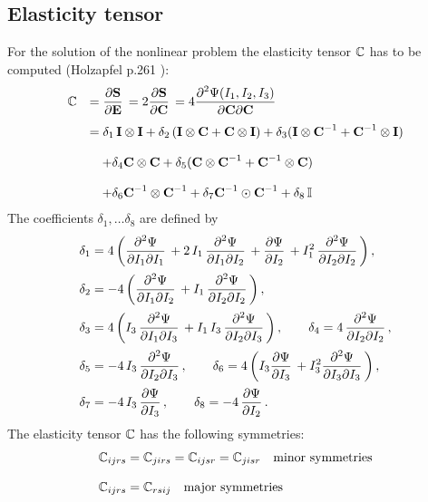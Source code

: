 \subsection{Elasticity tensor}
For the solution of the nonlinear problem the elasticity tensor $\mathbb{C}$ has to be computed (Holzapfel p.261  \cite{holzapfel2000nonlinear}):
\begin{equation*}
  \begin{array}{lll}
    \bbC &= \p{\bfS}{\bfE} = 2\p{\bfS}{\bfC} = 4\dfrac{\partial^2\Psi(I_1,I_2,I_3)}{\p\bfC\p\bfC}\\[4mm]
     &= \delta_1\,\bfI \otimes \bfI + \delta_2\,(\bfI \otimes \bfC + \bfC \otimes \bfI) + \delta_3 ( \bfI \otimes \bfC^{-1} + \bfC^{-1} \otimes \bfI)\\[4mm]
     &\quad +  \delta_4 \bfC \otimes \bfC + \delta_5(\bfC \otimes \bfC^{-1} + \bfC^{-1}\otimes \bfC) \\[4mm]
     & \quad + \delta_6 \bfC^{-1} \otimes \bfC^{-1} + \delta_7 \bfC^{-1} \odot \bfC^{-1} + \delta_8\,\bbI
  \end{array}
\end{equation*}
The coefficients $\delta_1, \dots \delta_8$ are defined by
\begin{equation*}
  \begin{array}{lll}
    \delta_1 = 4\left(\dfrac{\partial^2\Psi}{\p I_1 \p I_1} + 2\,I_1\,\dfrac{\partial^2\Psi}{\p I_1 \p I_2} + \p{\Psi}{I_2} + I_1^2\,\dfrac{\partial^2\Psi}{\p I_2 \p I_2} \right),\\[4mm]
    \delta_2 = -4\left(\dfrac{\partial^2\Psi}{\p I_1 \p I_2} + I_1\,\dfrac{\partial^2\Psi}{\p I_2 \p I_2}\right),\\[4mm]
    \delta_3 = 4\left(I_3\,\dfrac{\partial^2\Psi}{\p I_1 \p I_3} + I_1\,I_3\,\dfrac{\partial^2\Psi}{\p I_2 \p I_3}\right), \qquad \delta_4 = 4\,\dfrac{\partial^2\Psi}{\p I_2 \p I_2},\\[4mm]
    \delta_5 = -4\,I_3\,\dfrac{\partial^2\Psi}{\p I_2 \p I_3}, \qquad \delta_6 = 4\left(I_3\p{\Psi}{I_3} + I_3^2\dfrac{\partial^2\Psi}{\p I_3 \p I_3}\right),\\[4mm]
    \delta_7 = -4\,I_3\,\p{\Psi}{I_3}, \qquad \delta_8 = -4\,\p{\Psi}{I_2}.
  \end{array}
\end{equation*}
The elasticity tensor $\mathbb{C}$ has the following symmetries:
\begin{equation*}
  \begin{array}{lll}
   \mathbb{C}_{ijrs} = \mathbb{C}_{jirs} = \mathbb{C}_{ijsr} = \mathbb{C}_{jisr} \quad \text{minor symmetries}\\[4mm]
    \mathbb{C}_{ijrs} = \mathbb{C}_{rsij} \quad \text{major symmetries}
  \end{array}
\end{equation*}
